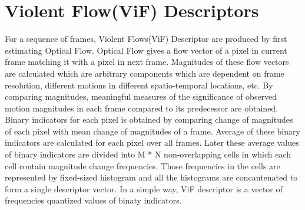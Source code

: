\section{Violent Flow(ViF) Descriptors}
For a sequence of frames, Violent Flows(ViF) Descriptor are produced by first estimating Optical Flow. Optical Flow gives a flow vector of a pixel in current frame matching it with a pixel in next frame. Magnitudes of these flow vectors are calculated which are arbitrary components which are dependent on frame resolution, different motions in different spatio-temporal locations, etc. By comparing magnitudes, meaningful measures of the significance of observed motion magnitudes in each frame compared to its predecessor are obtained. Binary indicators for each pixel is obtained by comparing change of magnitudes of each pixel with mean change of magnitudes of a frame. Average of these binary indicators are calculated for each pixel over all frames. Later these average values of binary indicators are divided into M * N non-overlapping cells in which each cell contain magnitude change frequencies. Those frequencies in the cells are represented by fixed-sized histogram and all the histograms are concantenated to form a single descriptor vector. In a simple way, ViF descriptor is a vector of frequencies quantized values of binaty indicators. 


